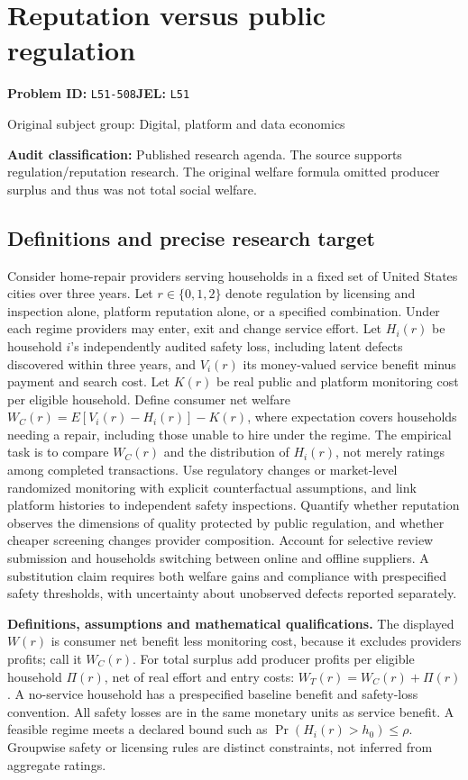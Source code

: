\documentclass[11pt,a4paper]{article}
\begin{document}
\section*{Reputation versus public regulation}
\textbf{Problem ID:} \texttt{L51-508}\quad \textbf{JEL:} \texttt{L51}\par
\label{problem:OP-0405}
{\sffamily\small\color{muted}Original subject group: Digital, platform and data economics\par}
\label{definitions:problem:30007687}
\textbf{Audit classification:} Published research agenda. The source supports regulation/reputation research. The original welfare formula omitted producer surplus and thus was not total social welfare.
\subsection*{Definitions and precise research target}
Consider home-repair providers serving households in a fixed set of United States cities over three years. Let \(r\in\{0,1,2\}\) denote regulation by licensing and inspection alone, platform reputation alone, or a specified combination. Under each regime providers may enter, exit and change service effort. Let \(H_i(r)\) be household \(i\)'s independently audited safety loss, including latent defects discovered within three years, and \(V_i(r)\) its money-valued service benefit minus payment and search cost. Let \(K(r)\) be real public and platform monitoring cost per eligible household. Define consumer net welfare \(W_C(r)=E[V_i(r)-H_i(r)]-K(r)\), where expectation covers households needing a repair, including those unable to hire under the regime. The empirical task is to compare \(W_C(r)\) and the distribution of \(H_i(r)\), not merely ratings among completed transactions. Use regulatory changes or market-level randomized monitoring with explicit counterfactual assumptions, and link platform histories to independent safety inspections. Quantify whether reputation observes the dimensions of quality protected by public regulation, and whether cheaper screening changes provider composition. Account for selective review submission and households switching between online and offline suppliers. A substitution claim requires both welfare gains and compliance with prespecified safety thresholds, with uncertainty about unobserved defects reported separately.

\textbf{Definitions, assumptions and mathematical qualifications.} The displayed \(W(r)\) is consumer net benefit less monitoring cost, because it excludes providers profits; call it \(W_C(r)\). For total surplus add producer profits per eligible household \(\Pi(r)\), net of real effort and entry costs: \(W_T(r)=W_C(r)+\Pi(r)\). A no-service household has a prespecified baseline benefit and safety-loss convention. All safety losses are in the same monetary units as service benefit. A feasible regime meets a declared bound such as \(\Pr(H_i(r)>h_0)\leq\rho\). Groupwise safety or licensing rules are distinct constraints, not inferred from aggregate ratings.
\end{document}
